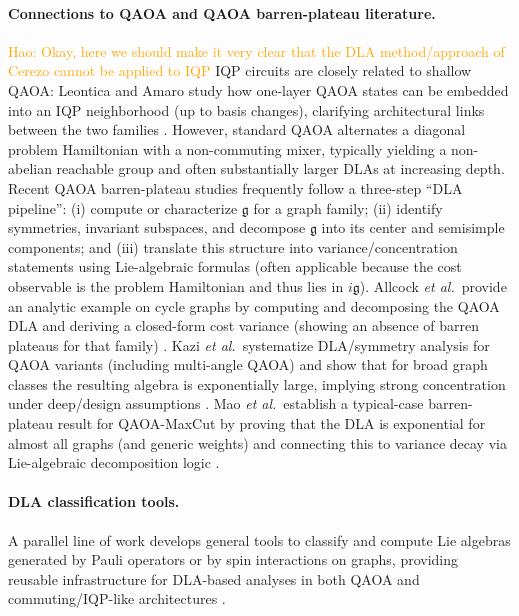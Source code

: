 \documentclass[a4paper,onecolumn,notitlepage,nofootinbib,longbibliography,superscriptaddress, floatfix, pra, aps, 10pt]{revtex4-2}
\newcommand\hw[1]{\textcolor{orange}{Hao: #1}}
\begin{document}
\paragraph{Connections to QAOA and QAOA barren-plateau literature.}
\hw{Okay, here we should make it very clear that the DLA method/approach of Cerezo cannot be applied to IQP}
IQP circuits are closely related to shallow QAOA: Leontica and Amaro study how one-layer QAOA states can be embedded into an IQP neighborhood (up to basis changes), clarifying architectural links between the two families \cite{LeonticaAmaroPRR2024}.
However, standard QAOA alternates a diagonal problem Hamiltonian with a non-commuting mixer, typically yielding a non-abelian reachable group and often substantially larger DLAs at increasing depth.
Recent QAOA barren-plateau studies frequently follow a three-step ``DLA pipeline'': (i) compute or characterize $\mathfrak g$ for a graph family; (ii) identify symmetries, invariant subspaces, and decompose $\mathfrak g$ into its center and semisimple components; and (iii) translate this structure into variance/concentration statements using Lie-algebraic formulas (often applicable because the cost observable is the problem Hamiltonian and thus lies in $i\mathfrak g$).
Allcock \emph{et al.}\ provide an analytic example on cycle graphs by computing and decomposing the QAOA DLA and deriving a closed-form cost variance (showing an absence of barren plateaus for that family) \cite{AllcockQAOADLA2407_12587}.
Kazi \emph{et al.}\ systematize DLA/symmetry analysis for QAOA variants (including multi-angle QAOA) and show that for broad graph classes the resulting algebra is exponentially large, implying strong concentration under deep/design assumptions \cite{KaziPRXQ2025}.
Mao \emph{et al.}\ establish a typical-case barren-plateau result for QAOA-MaxCut by proving that the DLA is exponential for almost all graphs (and generic weights) and connecting this to variance decay via Lie-algebraic decomposition logic \cite{MaoQAOAMaxCutBP2512_24577}.

\paragraph{DLA classification tools.}
A parallel line of work develops general tools to classify and compute Lie algebras generated by Pauli operators or by spin interactions on graphs, providing reusable infrastructure for DLA-based analyses in both QAOA and commuting/IQP-like architectures \cite{AguilarPauliLie2408_00081, KokcuGraphSpinDLA2409_19797}.
\end{document}
